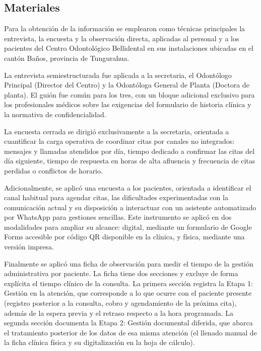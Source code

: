 \subsection{Materiales}

Para la obtención de la información se emplearon como técnicas principales la entrevista, la encuesta y la observación directa, aplicadas al personal y a los pacientes del Centro Odontológico Bellidental en sus instalaciones ubicadas en el cantón Baños, provincia de Tungurahua.

La entrevista semiestructurada fue aplicada a la secretaria, el Odontólogo Principal (Director del Centro) y la Odontóloga General de Planta (Doctora de planta). El guión fue común para los tres, con un bloque adicional exclusivo para los profesionales médicos sobre las exigencias del formulario de historia clínica y la normativa de confidencialidad. 

La encuesta cerrada se dirigió exclusivamente a la secretaria, orientada a cuantificar la carga operativa de coordinar citas por canales no integrados: mensajes y llamadas atendidos por día, tiempo dedicado a confirmar las citas del día siguiente, tiempo de respuesta en horas de alta afluencia y frecuencia de citas perdidas o conflictos de horario. 

Adicionalmente, se aplicó una encuesta a los pacientes, orientada a identificar el canal habitual para agendar citas, las dificultades experimentadas con la comunicación actual y su disposición a interactuar con un asistente automatizado por WhatsApp para gestiones sencillas. Este instrumento se aplicó en dos modalidades para ampliar su alcance: digital, mediante un formulario de Google Forms accesible por código QR disponible en la clínica, y física, mediante una versión impresa. 

Finalmente se aplicó una ficha de observación para medir el tiempo de la gestión administrativa por paciente. La ficha tiene dos secciones y excluye de forma explícita el tiempo clínico de la consulta. La primera sección registra la Etapa 1: Gestión en la atención, que corresponde a lo que ocurre con el paciente presente (registro posterior a la consulta, cobro y agendamiento de la próxima cita), además de la espera previa y el retraso respecto a la hora programada. La segunda sección documenta la Etapa 2: Gestión documental diferida, que abarca el tratamiento posterior de los datos de esa misma atención (el llenado manual de la ficha clínica física y su digitalización en la hoja de cálculo). 
